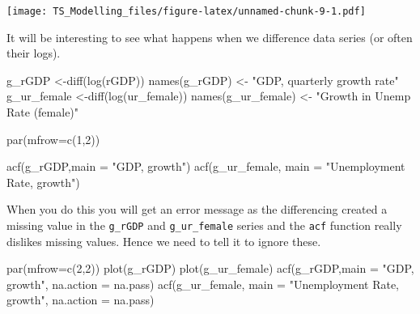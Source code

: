 \documentclass[
]{article}
\newenvironment{Shaded}{\begin{snugshade}}{\end{snugshade}}
\newcommand{\AttributeTok}[1]{\textcolor[rgb]{0.77,0.63,0.00}{#1}}
\newcommand{\DecValTok}[1]{\textcolor[rgb]{0.00,0.00,0.81}{#1}}
\newcommand{\FunctionTok}[1]{\textcolor[rgb]{0.00,0.00,0.00}{#1}}
\newcommand{\NormalTok}[1]{#1}
\newcommand{\OtherTok}[1]{\textcolor[rgb]{0.56,0.35,0.01}{#1}}
\newcommand{\StringTok}[1]{\textcolor[rgb]{0.31,0.60,0.02}{#1}}
\begin{document}
\texttt{[image: TS\_Modelling\_files/figure-latex/unnamed-chunk-9-1.pdf]}

It will be interesting to see what happens when we difference data
series (or often their logs).

\begin{Shaded}
\begin{Highlighting}[]
\NormalTok{g\_rGDP }\OtherTok{\textless{}{-}}\FunctionTok{diff}\NormalTok{(}\FunctionTok{log}\NormalTok{(rGDP))}
\FunctionTok{names}\NormalTok{(g\_rGDP) }\OtherTok{\textless{}{-}} \StringTok{"GDP, quarterly growth rate"}
\NormalTok{g\_ur\_female }\OtherTok{\textless{}{-}}\FunctionTok{diff}\NormalTok{(}\FunctionTok{log}\NormalTok{(ur\_female))}
\FunctionTok{names}\NormalTok{(g\_ur\_female) }\OtherTok{\textless{}{-}} \StringTok{"Growth in Unemp Rate (female)"}
\end{Highlighting}
\end{Shaded}

\begin{Shaded}
\begin{Highlighting}[]
\FunctionTok{par}\NormalTok{(}\AttributeTok{mfrow=}\FunctionTok{c}\NormalTok{(}\DecValTok{1}\NormalTok{,}\DecValTok{2}\NormalTok{))}

\FunctionTok{acf}\NormalTok{(g\_rGDP,}\AttributeTok{main =} \StringTok{"GDP, growth"}\NormalTok{)}
\FunctionTok{acf}\NormalTok{(g\_ur\_female, }\AttributeTok{main =} \StringTok{"Unemployment Rate, growth"}\NormalTok{)}
\end{Highlighting}
\end{Shaded}

When you do this you will get an error message as the differencing
created a missing value in the \texttt{g\_rGDP} and
\texttt{g\_ur\_female} series and the \texttt{acf} function really
dislikes missing values. Hence we need to tell it to ignore these.

\begin{Shaded}
\begin{Highlighting}[]
\FunctionTok{par}\NormalTok{(}\AttributeTok{mfrow=}\FunctionTok{c}\NormalTok{(}\DecValTok{2}\NormalTok{,}\DecValTok{2}\NormalTok{))}
\FunctionTok{plot}\NormalTok{(g\_rGDP)}
\FunctionTok{plot}\NormalTok{(g\_ur\_female)}
\FunctionTok{acf}\NormalTok{(g\_rGDP,}\AttributeTok{main =} \StringTok{"GDP, growth"}\NormalTok{, }\AttributeTok{na.action =}\NormalTok{ na.pass)}
\FunctionTok{acf}\NormalTok{(g\_ur\_female, }\AttributeTok{main =} \StringTok{"Unemployment Rate, growth"}\NormalTok{, }\AttributeTok{na.action =}\NormalTok{ na.pass)}
\end{Highlighting}
\end{Shaded}
\end{document}
